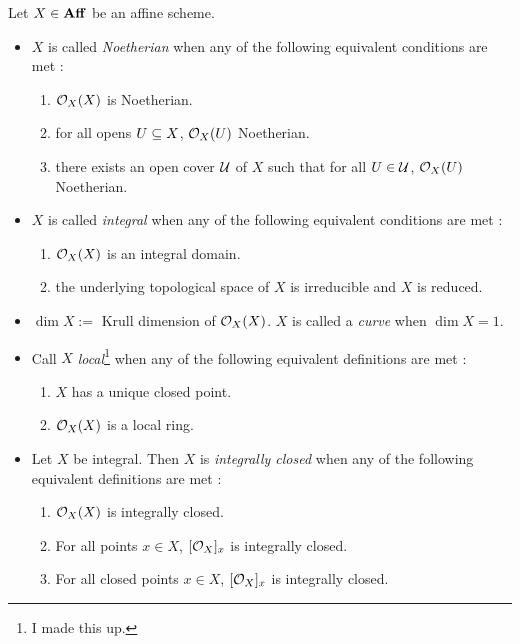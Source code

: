 \documentclass[./main.tex]{subfiles}
\begin{document}
  
\begin{dfn}

  Let $X \in \mathbf{Aff}$ be an affine scheme. 
  \begin{itemize}
    \item $X$ is called \emph{Noetherian} when 
    any of the following equivalent conditions are met : 
    \begin{enumerate}
      \item $\mathcal{O}_X(X)$ is Noetherian.
      \item for all opens $U \subseteq X$, $\mathcal{O}_X(U)$ Noetherian.
      \item there exists an open cover $\mathcal{U}$ of $X$ such that 
      for all $U \in \mathcal{U}$, $\mathcal{O}_X(U)$ Noetherian. 
    \end{enumerate}
    \item $X$ is called \emph{integral} when 
    any of the following equivalent conditions are met : 
    \begin{enumerate}
      \item $\mathcal{O}_X(X)$ is an integral domain.
      \item the underlying topological space of $X$ is irreducible and 
      $X$ is reduced. 
    \end{enumerate}
    \item $\dim X := $ Krull dimension of $\mathcal{O}_X(X)$. 
    $X$ is called a \emph{curve} when $\dim X = 1$.
    \item Call $X$ \emph{local}\footnote{
      I made this up. 
    } when 
    any of the following equivalent definitions are met : 
    \begin{enumerate}
      \item $X$ has a unique closed point.
      \item $\mathcal{O}_X(X)$ is a local ring. 
    \end{enumerate}
    \item Let $X$ be integral. 
    Then $X$ is \emph{integrally closed} when 
    any of the following equivalent definitions are met : 
    \begin{enumerate}
      \item $\mathcal{O}_X(X)$ is integrally closed.
      \item For all points $x \in X$, $[\mathcal{O}_X]_x$ is integrally closed.
      \item For all closed points $x \in X$, $[\mathcal{O}_X]_x$ is integrally closed.
    \end{enumerate}
  \end{itemize}
\end{dfn}
\end{document}
